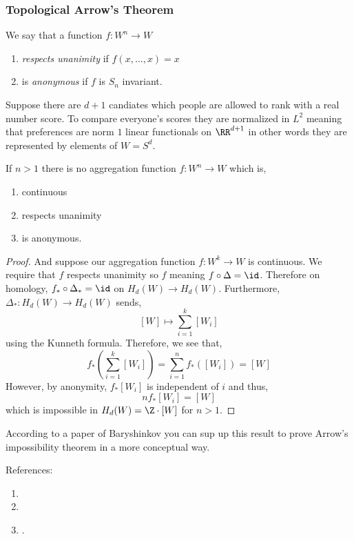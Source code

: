 \documentclass[12pt]{article}
\begin{document}
\subsubsection{Topological Arrow's Theorem}

We say that a function $f : W^n \to W$
\begin{enumerate}
\item \textit{respects unanimity} if $f(x, \dots, x) = x$
\item is \textit{anonymous} if $f$ is $S_n$ invariant.
\end{enumerate}
Suppose there are $d+1$ candiates which people are allowed to rank with a real number score. To compare everyone's scores they are normalized in $L^2$ meaning that preferences are norm $1$ linear functionals on $\RR^{d+1}$ in other words they are represented by elements of $W = S^{d}$. 

\begin{theorem}[Chichilnisky]
If $n > 1$ there is no aggregation function $f : W^n \to W$ which is,
\begin{enumerate}
\item continuous
\item respects unanimity
\item is anonymous.
\end{enumerate}
\end{theorem}

\begin{proof}

And suppose our aggregation function $f : W^k \to W$ is continuous. We require that $f$ respects unanimity so $f$ meaning $f \circ \Delta = \id$. Therefore on homology, $f_* \circ \Delta_* = \id$ on $H_{d}(W) \to H_{d}(W)$. Furthermore, $\Delta_* : H_{d}(W) \to H_{d}(W)$ sends,
\[ [W] \mapsto \sum_{i = 1}^k [W_i] \]
using the Kunneth formula. Therefore, we see that,
\[ f_* \left( \sum_{i = 1}^k [W_i] \right) = \sum_{i = 1}^n f_*([W_i]) = [W] \]
However, by anonymity, $f_* [W_i]$ is independent of $i$ and thus,
\[ n f_* [W_i] = [W] \]
which is impossible in $H_d(W) = \Z \cdot [W]$ for $n > 1$. 
\end{proof}

\begin{rmk}
According to a paper of Baryshinkov you can sup up this result to prove Arrow's impossibility theorem in a more conceptual way.
\end{rmk}

References:

\begin{enumerate}
\item {}

\item {}

\item {}.
\end{enumerate}
\end{document}

